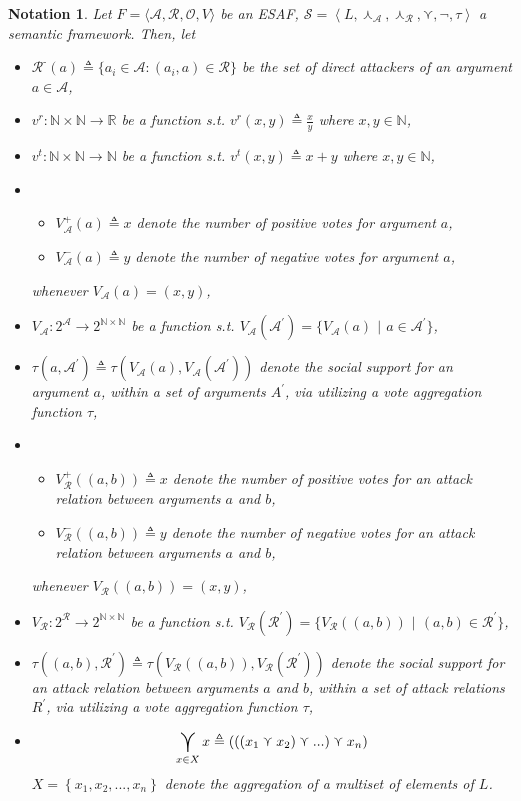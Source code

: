\documentclass{article}
\newtheorem{notation}{Notation}
\newcommand{\nat}{\mathbb{N}}   %
\newcommand{\real}{\mathbb{R}}  %
\newcommand{\args}{\mathcal{A}} %
\newcommand{\att}{\mathcal{R}}  %
\newcommand{\valueset}{L}
\newcommand{\obj}{\mathcal{O}} %
\newcommand{\varg}{V_{\args}}   %
\newcommand{\vargpro}[1]{\varg^+\left(#1\right)} %
\newcommand{\vargcon}[1]{\varg^-\left(#1\right)} %
\newcommand{\vatt}{V_{\att}}   %
\newcommand{\vattpro}[1]{\vatt^+\left(#1\right)} %
\newcommand{\vattcon}[1]{\vatt^-\left(#1\right)} %
\newcommand{\attackers}[1]{\att^\text{-}\left(#1\right)}
\newcommand{\safid}{F}               %
\newcommand{\safbodyO}{\langle \args, \att, \obj, V \rangle} %
\newcommand{\safO}{\safid = \safbodyO} %
\newcommand{\sembodyNew}{\left\langle \valueset,\SAFand_\mathcal{A}, \SAFand_\mathcal{R},\SAFor,\lnot,\tau \right\rangle} %
\newcommand{\SAFand}{\curlywedge}     %
\newcommand{\SAFor}{\curlyvee}        %
\DeclareMathOperator*{\SAFOr}{\bigcurlyvee} %
\newcommand{\sem}{\mathcal{S}}
\begin{document}
\begin{notation}
Let $\safO$ be an ESAF, $\sem = \sembodyNew$ a semantic framework. Then, let
\begin{itemize}
\item $\attackers{a} \triangleq \{a_i \in \args: (a_i, a) \in \att\}$ be the set of direct attackers of an argument $a \in \args$, 
\item $v^r: \nat \times \nat \to \real$ be a function s.t. $v^r(x, y) \triangleq \frac{x}{y}$ where $x, y \in \mathbb{N}$,
\item $v^t: \nat \times \nat \to \nat$ be a function s.t. $v^t(x, y) \triangleq x + y$ where $x, y \in \mathbb{N}$, 
\item 
\begin{itemize}
\item $\vargpro a \triangleq x$ denote the number of positive votes for argument $a$,
\item $\vargcon a \triangleq y$ denote the number of negative votes for argument $a$,
\end{itemize}
whenever $\varg (a) = (x, y)$,
\\
\item $\varg: 2^\args \to 2^{\nat \times \nat}$ be a function s.t. $\varg(\mathcal{A}^{'}) = \{\varg(a)$ $|$ $a \in \mathcal{A}^{'}\}$,
\item $\tau(a, \mathcal{A}^{'}) \triangleq \tau(V_{\mathcal{A}}(a), \varg(\mathcal{A}^{'}))$ denote the social support for an argument $a$, within a set of arguments $A^{'}$, via utilizing a vote aggregation function $\tau$,
\item
\begin{itemize}
\item $\vattpro{(a, b)} \triangleq x$ denote the number of positive votes for an attack relation between arguments  $a$ and $b$,
\item  $ \vattcon{(a, b)} \triangleq y$ denote the number of negative votes for an attack relation between arguments  $a$ and $b$,
\end{itemize}
whenever $\vatt ((a, b)) = (x, y)$,
\\
\item $\vatt: 2^\att \to 2^{\nat \times \nat}$ be a function s.t. $\vatt(\mathcal{R}^{'}) = \{\vatt((a, b))$ $|$ $(a, b) \in\mathcal{R}^{'}\}$,
\item $\tau((a, b), \mathcal{R}^{'}) \triangleq \tau(V_{\mathcal{R}}((a, b)), \vatt(\mathcal{R}^{'}))$ denote the social support for an attack relation between arguments  $a$ and $b$, within a set of attack relations $R^{'}$, via utilizing a vote aggregation function $\tau$,
\item$$\SAFOr_{x \in X} x \triangleq\left(\left(\left(  x_{1}\SAFor x_{2}\right) \SAFor...\right)\SAFor x_{n}\right)$$ $X=\left\{  x_{1},x_{2},...,x_{n}\right\}$ denote the aggregation of a multiset of elements of $\valueset$. 


\end{itemize}
\end{notation}
\end{document}
